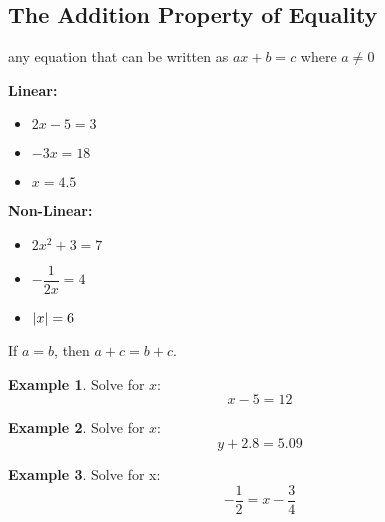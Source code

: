 \documentclass[addpoints,12pt]{exam}
\theoremstyle{definition}
\theoremstyle{break}
\theoremstyle{break}
\newtheorem{example}{Example}[subsection]
\begin{document}
\setcounter{section}{2}
\setcounter{subsection}{0}

\subsection{The Addition Property of Equality}

\vspace{.25in}

\begin{definition}
any equation that can be written as $ax+b=c$ where $a\neq 0$
\end{definition}

\vspace{.15in}

\begin{minipage}{.5\textwidth}
\textbf{Linear:}
\begin{itemize}
\item $2x - 5 = 3$
\item $-3x = 18$
\item $x = 4.5$
\end{itemize}
\end{minipage}%
\begin{minipage}{.5\textwidth}
\textbf{Non-Linear:}
\begin{itemize}
\item $2x^2 + 3 = 7$
\item $-\dfrac{1}{2x}=4$
\item $\abs{x} = 6$
\end{itemize}
\end{minipage}%


\vspace{.15in}

\begin{definition}
If $a = b$, then $a + c = b + c$.
\end{definition}
\vspace{.15in}

\begin{example}
Solve for $x$: \[ x - 5 = 12\]
\vspace{1in}
\end{example}

\begin{example}
Solve for $x$: \[ y + 2.8 = 5.09\]
\vspace{1in}
\end{example}

\newpage

\begin{example}
Solve for x: \[-\dfrac{1}{2} = x - \dfrac{3}{4}\]
\vspace{2in}
\end{example}
\end{document}
